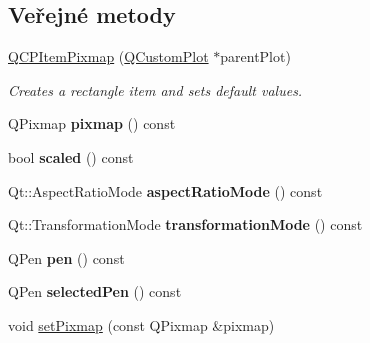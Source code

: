 \subsection*{Veřejné metody}
\begin{DoxyCompactItemize}
\item 
\hyperlink{classQCPItemPixmap_aa6de42a37261b21a5480e7da122345c3}{Q\+C\+P\+Item\+Pixmap} (\hyperlink{classQCustomPlot}{Q\+Custom\+Plot} $\ast$parent\+Plot)
\begin{DoxyCompactList}\small\item\em Creates a rectangle item and sets default values. \end{DoxyCompactList}\item 
\hypertarget{classQCPItemPixmap_a73dea89e0eb45127a2705e2c7991b8d8}{}Q\+Pixmap {\bfseries pixmap} () const \label{classQCPItemPixmap_a73dea89e0eb45127a2705e2c7991b8d8}

\item 
\hypertarget{classQCPItemPixmap_a54026b89dff3c60376c2360f01b6fb83}{}bool {\bfseries scaled} () const \label{classQCPItemPixmap_a54026b89dff3c60376c2360f01b6fb83}

\item 
\hypertarget{classQCPItemPixmap_ac5b95c097169e107a61eebbb7c77523c}{}Qt\+::\+Aspect\+Ratio\+Mode {\bfseries aspect\+Ratio\+Mode} () const \label{classQCPItemPixmap_ac5b95c097169e107a61eebbb7c77523c}

\item 
\hypertarget{classQCPItemPixmap_a1d4751a7b9588354fc8e726d891153f7}{}Qt\+::\+Transformation\+Mode {\bfseries transformation\+Mode} () const \label{classQCPItemPixmap_a1d4751a7b9588354fc8e726d891153f7}

\item 
\hypertarget{classQCPItemPixmap_ab2b821c80cfade589472e933b9c4361f}{}Q\+Pen {\bfseries pen} () const \label{classQCPItemPixmap_ab2b821c80cfade589472e933b9c4361f}

\item 
\hypertarget{classQCPItemPixmap_af8e839d7c7b84e214608feda3caec2bc}{}Q\+Pen {\bfseries selected\+Pen} () const \label{classQCPItemPixmap_af8e839d7c7b84e214608feda3caec2bc}

\item 
\hypertarget{classQCPItemPixmap_a726b69ea4025edf48f9b29b6450548a7}{}void \hyperlink{classQCPItemPixmap_a726b69ea4025edf48f9b29b6450548a7}{set\+Pixmap} (const Q\+Pixmap \&pixmap)\label{classQCPItemPixmap_a726b69ea4025edf48f9b29b6450548a7}


\end{DoxyCompactItemize}
